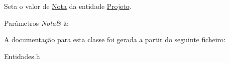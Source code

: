 \-Seta o valor de \hyperlink{class_nota}{\-Nota} da entidade \hyperlink{class_projeto}{\-Projeto}. 


\begin{DoxyParams}{\-Parâmetros}
{\em \-Nota\&} & \\
\hline
\end{DoxyParams}


\-A documentação para esta classe foi gerada a partir do seguinte ficheiro\-:\begin{DoxyCompactItemize}
\item 
\-Entidades.\-h\end{DoxyCompactItemize}
